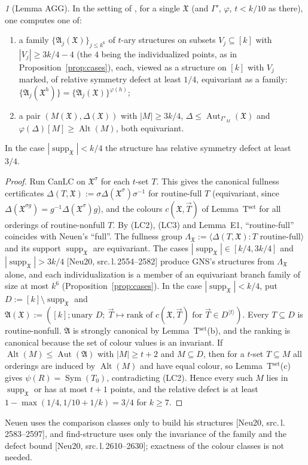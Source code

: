\documentclass[11pt]{article}
\newenvironment{enumlab}[2][]{\begin{enumerate}\renewcommand{\theenumi}{#1#2{enumi}}%
  \renewcommand{\labelenumi}{(\theenumi)}}{\end{enumerate}}
\theoremstyle{plain}
\theoremstyle{definition}
\theoremstyle{remark}
\theoremstyle{named}
\newtheorem*{named}{}
\theoremstyle{namedrm}
\newcommand{\Sym}{\operatorname{Sym}}
\newcommand{\Alt}{\operatorname{Alt}}
\newcommand{\Aut}{\operatorname{Aut}}
\newcommand{\supp}{\operatorname{supp}}
\newcommand{\fA}{\mathfrak{A}}
\newcommand{\fX}{\mathfrak{X}}
\newcommand{\vT}{\vec{T}}
\newcommand{\src}[2]{[#1, src.\,l.\,#2]}
\begin{document}
\begin{named}[Lemma AGG]
In the setting of \cite[Lemma~4.29]{Neu20}, for a single $\fX$ (and $\Gamma'$, $\varphi$, $t<k/10$ as there), one
computes one of:
\begin{enumlab}{\roman}
\item a family $\{\fA_j(\fX)\}_{j\le k^6}$ of $t$-ary structures on subsets $V_j\subseteq[k]$ with $|V_j|\ge3k/4-4$ (the $4$ being the individualized points, as in Proposition~\ref{prop:cases}), each,
  viewed as a structure on $[k]$ with $V_j$ marked, of relative symmetry defect at least $1/4$, equivariant as a family:
  $\{\fA_j(\fX^h)\}=\{\fA_j(\fX)\}^{\varphi(h)}$;
\item a pair $(M(\fX),\Delta(\fX))$ with $|M|\ge3k/4$, $\Delta\le\Aut_{\Gamma'_M}(\fX)$ and $\varphi(\Delta)[M]\ge\Alt(M)$, both
  equivariant.
\end{enumlab}
In the case $|\supp_\fX|<k/4$ the structure has relative symmetry defect at least $3/4$.
\end{named}
\begin{proof}
Run CanLC on $\fX^\sigma$ for each $t$-set $T$. This gives the canonical fullness certificates
$\Delta(T,\fX):=\sigma\Delta(\fX^\sigma)\sigma^{-1}$ for routine-full $T$ (equivariant, since
$\Delta(\fX^{\sigma g})=g^{-1}\Delta(\fX^\sigma)g$), and the colours $c(\fX,\vT)$ of Lemma~T$^{\text{set}}$ for all orderings
of routine-nonfull $T$. By (LC2), (LC3) and Lemma~E1, ``routine-full'' coincides with Neuen's ``full''. The
fullness group $\Lambda_\fX:=\langle\Delta(T,\fX):T\text{ routine-full}\rangle$ and its support $\supp_\fX$ are equivariant. The
cases $|\supp_\fX|\in[k/4,3k/4]$ and $|\supp_\fX|>3k/4$ \src{Neu20}{2554--2582} produce GNS's structures from $\Lambda_\fX$ alone, and
each individualization is a member of an equivariant branch family of size at most $k^6$
(Proposition~\ref{prop:cases}). In the case $|\supp_\fX|<k/4$, put $D:=[k]\setminus\supp_\fX$ and
$\fA(\fX):=([k];\text{unary }D;\ \vT\mapsto\text{rank of }c(\fX,\vT)\text{ for }\vT\in D^{\langle t\rangle})$. Every
$T\subseteq D$ is routine-nonfull. $\fA$ is strongly canonical by Lemma~T$^{\text{set}}$(b), and the ranking is
canonical because the set of colour values is an invariant. If $\Alt(M)\le\Aut(\fA)$ with $|M|\ge t+2$ and
$M\subseteq D$, then for a $t$-set $T\subseteq M$ all orderings are induced by $\Alt(M)$ and have equal colour, so
Lemma~T$^{\text{set}}$(c) gives $\psi(R)=\Sym(T_0)$, contradicting (LC2). Hence every such $M$ lies in $\supp_\fX$ or has at
most $t+1$ points, and the relative defect is at least $1-\max(1/4,1/10+1/k)=3/4$ for $k\ge7$.
\end{proof}
Neuen uses the comparison classes only to build his structures \src{Neu20}{2583--2597}, and find-structure
uses only the invariance of the family and the defect bound \src{Neu20}{2610--2630}; exactness of the colour
classes is not needed.
\end{document}
